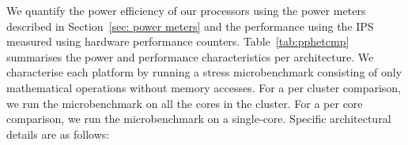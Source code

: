 \begin{table}[t]
\setlength{\tabcolsep}{1mm}
\centering
    \caption[Power and performance characterisation per architecture]{ Power and performance measured using a microbenchmark on each architecture}
\label{tab:pphetcmp}
\end{table} 

 We quantify the power efficiency of our processors using the power meters
described in Section~\ref{sec: power meters} and the performance using the IPS measured
using hardware performance counters.  Table~\ref{tab:pphetcmp} summarises the power and
performance characteristics per architecture. We characterise each platform by running a
stress microbenchmark consisting of only mathematical operations without memory accesses.
For a per cluster comparison, we run the microbenchmark on all the cores in the cluster.
For a per core comparison, we run the microbenchmark on a single-core.  Specific
architectural details are as follows:

